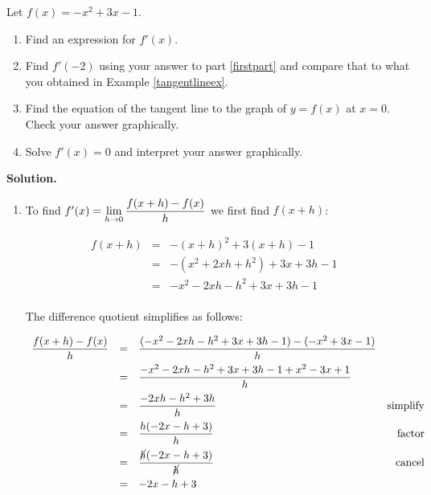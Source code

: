 \documentclass{ximera}
\begin{document}
\pagebreak


\begin{ex}  \label{derivativeex}  Let $f(x) = -x^2 + 3x-1$.  

\begin{enumerate}

\item \label{firstpart} Find an expression for $f'(x)$.  

\item  Find $f'(-2)$ using your answer to part \ref{firstpart}   and compare that to what you obtained in Example \ref{tangentlineex}.

\item  Find the equation of the tangent line to the graph of $y = f(x)$ at $x = 0$.  Check your answer graphically.

\item  Solve $f'(x) = 0 $ and interpret your answer graphically.

\end{enumerate}

\bigskip

{\bf Solution.}

\begin{enumerate}

\item  To find  $f'(x) = \ds{ \lim_{h \rightarrow 0} \dfrac{f(x+h) - f(x)}{h}}$ we  first find $f(x+h)$:

\[ \begin{array}{rclr}  
  f(x+h) & = & -(x+h)^2 +3(x+h) -1 & \\ 
  & = & - (x^2 +2xh+h^2) +3x+3h-1 & \\
 & = & -x^2 -  2xh - h^2+3x+3h-1& \\
 \end{array} \]

The difference quotient simplifies as follows:

\[ \begin{array}{rclr}

\dfrac{f(x+h)-f(x)}{h} & = & \dfrac{( -x^2 - 2xh - h^2+3x+3h-1) -(-x^2+3x-1)}{h} & \\[8pt]
                                & = & \dfrac{-x^2 - 2xh - h^2+3x+3h-1 + x^2-3x+1}{h} & \\[8pt]
                                 & = & \dfrac{-2xh-h^2+3h}{h} & \text{simplify}\\[8pt]
                                & = &  \dfrac{h(-2x - h + 3)}{h} & \text{factor} \\[8pt]
                                & = &  \dfrac{\cancel{h}(-2x-h+3)}{\cancel{h}} &  \text{cancel} \\[8pt]
                                & = & -2x-h+3\\ \end{array} \]


\end{enumerate}
\end{ex}
\end{document}
